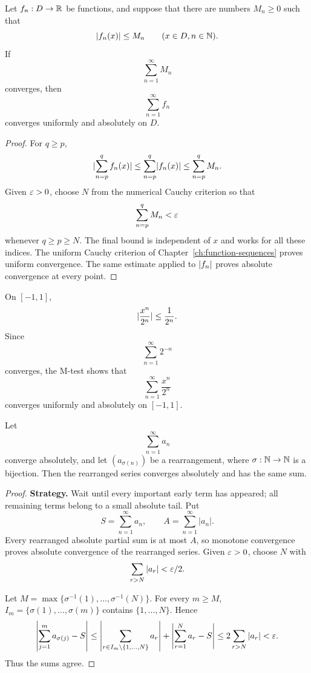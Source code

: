 \begin{theorem}
\label{thm:weierstrass-m-test}
Let $f_n:D\to\mathbb{R}$ be functions, and suppose that there are numbers $M_n\geq0$
such that
\[
\lvert f_n(x)\rvert\leq M_n
\qquad(x\in D, n\in\mathbb{N}).
\]
If
\[
\sum_{n=1}^{\infty}M_n
\]
converges, then
\[
\sum_{n=1}^{\infty}f_n
\]
converges uniformly and absolutely on $D$.
\end{theorem}
\begin{proof}
For $q\geq p$,
\[
\lvert \sum_{n=p}^{q}f_n(x)\rvert
\leq\sum_{n=p}^{q}\lvert f_n(x)\rvert
\leq\sum_{n=p}^{q}M_n.
\]
Given $\varepsilon>0$, choose $N$ from the numerical Cauchy criterion so
that
\[
\sum_{n=p}^q M_n<\varepsilon
\]
 whenever $q\geq p\geq N$.
The final bound is independent of $x$ and works for all these indices.  The uniform Cauchy
criterion of Chapter~\ref{ch:function-sequences} proves uniform convergence.
The same estimate applied to $\lvert f_n\rvert$ proves absolute convergence at every
point.
\end{proof}

\begin{example}
On $[-1,1]$,
\[
\lvert \frac{x^n}{2^n}\rvert\leq\frac1{2^n}.
\]
Since
\[
\sum_{n=1}^{\infty}2^{-n}
\]
 converges, the M-test shows that
\[
\sum_{n=1}^{\infty}\frac{x^n}{2^n}
\]
converges uniformly and absolutely on $[-1,1]$.
\end{example}

\begin{theorem}
\label{thm:absolute-rearrangement}
Let
\[
\sum_{n=1}^{\infty}a_n
\]
converge absolutely, and let $(a_{\sigma(n)})$ be a rearrangement, where $\sigma:\mathbb{N}\to\mathbb{N}$ is a bijection. Then the rearranged series converges absolutely and has the same sum.
\end{theorem}
\begin{proof}
\textbf{Strategy.} Wait until every important early term has appeared;
all remaining terms belong to a small absolute tail.
Put \[S=\sum_{n=1}^\infty a_n,\qquad A=\sum_{n=1}^\infty|a_n|.\]
Every rearranged absolute partial sum is at most $A$, so monotone
convergence proves absolute convergence of the rearranged series.
Given $\varepsilon>0$, choose $N$ with
\[
\sum_{r>N}|a_r|<\varepsilon/2.
\]

Let $M=\max\{\sigma^{-1}(1),\ldots,\sigma^{-1}(N)\}$.
For every $m\geq M$, $I_m=\{\sigma(1),\ldots,\sigma(m)\}$
contains $\{1,\ldots,N\}$. Hence
\[
\left|\sum_{j=1}^m a_{\sigma(j)}-S\right|
\leq\left|\sum_{r\in I_m\setminus\{1,\ldots,N\}}a_r\right|
+\left|\sum_{r=1}^N a_r-S\right|
\leq 2\sum_{r>N}|a_r|<\varepsilon.
\]
Thus the sums agree.
\end{proof}

